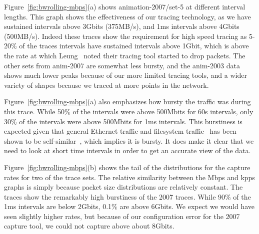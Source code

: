 Figure~\ref{fig:bwrolling-mbps}(a) shows animation-2007/set-5 at
different interval lengths.  This graph shows the effectiveness of our
tracing technology, as we have sustained intervals above 3Gbits
(375MB/s), and 1ms intervals above 4Gbits (500MB/s). Indeed these
traces show the requirement for high speed tracing as 5-20\% of the
traces intervals have sustained intervals above 1Gbit, which is above
the rate at which Leung~\cite{LeungUsenix08} noted their tracing tool
started to drop packets.  The other sets from anim-2007 are somewhat
less bursty, and the anim-2003 data shows much lower peaks because of
our more limited tracing tools, and a wider variety of shapes because
we traced at more points in the network.

Figure~\ref{fig:bwrolling-mbps}(a) also emphasizes how bursty the traffic was
during this trace. While 50\% of the intervals were above 500Mbits for
60s intervals, only 30\% of the intervals were above 500Mbits for 1ms
intervals.  This burstiness is expected given that
general Ethernet traffic and filesystem
traffic~\cite{Gribble98selfsimilar} has been shown to be
self-similar~\cite{Leland94selfsimilar}, which implies it is bursty.
It does make it clear that we need to look at short time intervals in
order to get an accurate view of the data.

Figure~\ref{fig:bwrolling-mbps}(b) shows the tail of the distributions for
the capture rates for two of the trace sets.  The relative similarity
between the Mbps and kpps graphs is simply because packet size
distributions are relatively constant.  The traces show the remarkably high
burstiness of the 2007 traces.  While 90\% of the 1ms intervals are
below 2Gbits, 0.1\% are above 6Gbits.  We expect we would have seen
slightly higher rates, but because of our configuration error for the
2007 capture tool, we could not capture above about 8Gbits.

\begin{figure*}
\caption{Bandwidth measured in the collection process.  In figure (b),
animation-2007/set-5 at different intervals is the top group of 4 lines, and
animation-2003/set-12 is the bottom group of 4 lines. animation-2003/set-12 does not go
all the way to the right at 60s intervals because there were
insufficient data points for the 0.9999 quantile.}
\label{fig:bwrolling-mbps}
\end{figure*}

